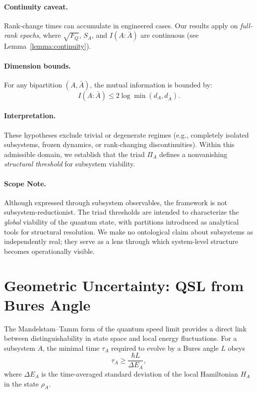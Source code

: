 \documentclass[10pt]{article}
\begin{document}
\paragraph{Continuity caveat.}
Rank-change times can accumulate in engineered cases. Our results apply on \emph{full-rank epochs}, where $\sqrt{F_Q}$, $S_A$, and $I(A:\bar{A})$ are continuous (see Lemma~\ref{lemma:continuity}).

\paragraph{Dimension bounds.}
For any bipartition $(A,\bar{A})$, the mutual information is bounded by:
\begin{equation}
I(A:\bar{A}) \leq 2 \log \min(d_A, d_{\bar{A}}).
\end{equation}

\paragraph{Interpretation.}
These hypotheses exclude trivial or degenerate regimes (e.g., completely isolated subsystems, frozen dynamics, or rank-changing discontinuities). Within this admissible domain, we establish that the triad $\Pi_A$ defines a nonvanishing \emph{structural threshold} for subsystem viability.

\paragraph{Scope Note.}
Although expressed through subsystem observables, the framework is not subsystem-reductionist. The triad thresholds are intended to characterize the \emph{global} viability of the quantum state, with partitions introduced as analytical tools for structural resolution. We make no ontological claim about subsystems as independently real; they serve as a lens through which system-level structure becomes operationally visible.

\section{Geometric Uncertainty: QSL from Bures Angle}

The Mandelstam--Tamm form of the quantum speed limit provides a direct link between distinguishability
in state space and local energy fluctuations. For a subsystem $A$, the minimal time $\tau_A$ required
to evolve by a Bures angle $L$ obeys
\begin{equation}
\tau_A \geq \frac{\hbar L}{\Delta E_A},
\end{equation}
where $\Delta E_A$ is the time-averaged standard deviation of the local Hamiltonian $H_A$ in the
state $\rho_A$.
\end{document}
